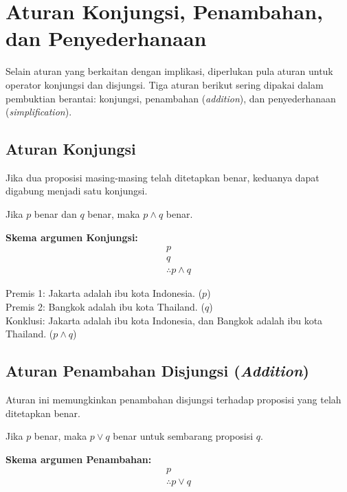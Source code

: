 \section{Aturan Konjungsi, Penambahan, dan Penyederhanaan}

Selain aturan yang berkaitan dengan implikasi, diperlukan pula aturan untuk operator konjungsi dan disjungsi. Tiga aturan berikut sering dipakai dalam pembuktian berantai: konjungsi, penambahan (\textit{addition}), dan penyederhanaan (\textit{simplification}).

\subsection{Aturan Konjungsi}

Jika dua proposisi masing-masing telah ditetapkan benar, keduanya dapat digabung menjadi satu konjungsi.

\begin{teorema}[Konjungsi]
Jika $p$ benar dan $q$ benar, maka $p \land q$ benar.
\end{teorema}

\textbf{Skema argumen Konjungsi:}
\[
\begin{array}{c}
p \\
q \\
\hline
\therefore p \wedge q
\end{array}
\]

\begin{contoh}
Premis 1: Jakarta adalah ibu kota Indonesia. ($p$) \\
Premis 2: Bangkok adalah ibu kota Thailand. ($q$) \\
Konklusi: Jakarta adalah ibu kota Indonesia, dan Bangkok adalah ibu kota Thailand. ($p \land q$)
\end{contoh}

\subsection{Aturan Penambahan Disjungsi (\textit{Addition})}

Aturan ini memungkinkan penambahan disjungsi terhadap proposisi yang telah ditetapkan benar.

\begin{teorema}
Jika $p$ benar, maka $p \vee q$ benar untuk sembarang proposisi $q$.
\end{teorema}

\textbf{Skema argumen Penambahan:}
\[
\begin{array}{c}
p \\
\hline
\therefore p \vee q
\end{array}
\]

